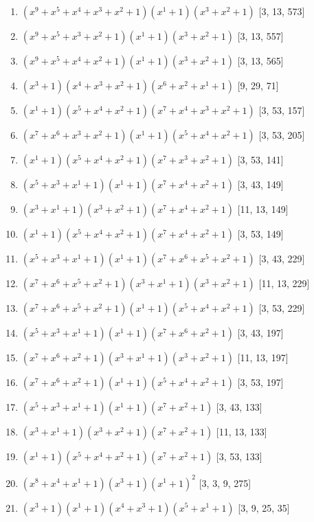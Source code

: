 \documentclass[10pt,twocolumn]{article}
\begin{document}
\begin{enumerate}
\item $(x^{9} + x^{5} + x^{4} + x^{3} + x^{2} + 1)(x^{1} + 1)(x^{3} + x^{2} + 1)$  [3, 13, 573]
\item $(x^{9} + x^{5} + x^{3} + x^{2} + 1)(x^{1} + 1)(x^{3} + x^{2} + 1)$  [3, 13, 557]
\item $(x^{9} + x^{5} + x^{4} + x^{2} + 1)(x^{1} + 1)(x^{3} + x^{2} + 1)$  [3, 13, 565]
\item $(x^{3} + 1)(x^{4} + x^{3} + x^{2} + 1)(x^{6} + x^{2} + x^{1} + 1)$  [9, 29, 71]
\item $(x^{1} + 1)(x^{5} + x^{4} + x^{2} + 1)(x^{7} + x^{4} + x^{3} + x^{2} + 1)$  [3, 53, 157]
\item $(x^{7} + x^{6} + x^{3} + x^{2} + 1)(x^{1} + 1)(x^{5} + x^{4} + x^{2} + 1)$  [3, 53, 205]
\item $(x^{1} + 1)(x^{5} + x^{4} + x^{2} + 1)(x^{7} + x^{3} + x^{2} + 1)$  [3, 53, 141]
\item $(x^{5} + x^{3} + x^{1} + 1)(x^{1} + 1)(x^{7} + x^{4} + x^{2} + 1)$  [3, 43, 149]
\item $(x^{3} + x^{1} + 1)(x^{3} + x^{2} + 1)(x^{7} + x^{4} + x^{2} + 1)$  [11, 13, 149]
\item $(x^{1} + 1)(x^{5} + x^{4} + x^{2} + 1)(x^{7} + x^{4} + x^{2} + 1)$  [3, 53, 149]
\item $(x^{5} + x^{3} + x^{1} + 1)(x^{1} + 1)(x^{7} + x^{6} + x^{5} + x^{2} + 1)$  [3, 43, 229]
\item $(x^{7} + x^{6} + x^{5} + x^{2} + 1)(x^{3} + x^{1} + 1)(x^{3} + x^{2} + 1)$  [11, 13, 229]
\item $(x^{7} + x^{6} + x^{5} + x^{2} + 1)(x^{1} + 1)(x^{5} + x^{4} + x^{2} + 1)$  [3, 53, 229]
\item $(x^{5} + x^{3} + x^{1} + 1)(x^{1} + 1)(x^{7} + x^{6} + x^{2} + 1)$  [3, 43, 197]
\item $(x^{7} + x^{6} + x^{2} + 1)(x^{3} + x^{1} + 1)(x^{3} + x^{2} + 1)$  [11, 13, 197]
\item $(x^{7} + x^{6} + x^{2} + 1)(x^{1} + 1)(x^{5} + x^{4} + x^{2} + 1)$  [3, 53, 197]
\item $(x^{5} + x^{3} + x^{1} + 1)(x^{1} + 1)(x^{7} + x^{2} + 1)$  [3, 43, 133]
\item $(x^{3} + x^{1} + 1)(x^{3} + x^{2} + 1)(x^{7} + x^{2} + 1)$  [11, 13, 133]
\item $(x^{1} + 1)(x^{5} + x^{4} + x^{2} + 1)(x^{7} + x^{2} + 1)$  [3, 53, 133]
\item $(x^{8} + x^{4} + x^{1} + 1)(x^{3} + 1)(x^{1} + 1)^{2}$  [3, 3, 9, 275]
\item $(x^{3} + 1)(x^{1} + 1)(x^{4} + x^{3} + 1)(x^{5} + x^{1} + 1)$  [3, 9, 25, 35]

\end{enumerate}
\end{document}
